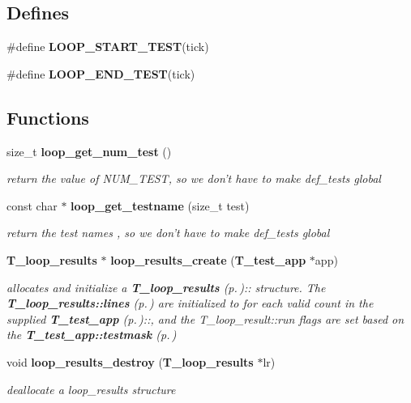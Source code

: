 \subsection*{Defines}
\begin{CompactItemize}
\item 
\#define {\bf LOOP\_\-START\_\-TEST}(tick)
\item 
\#define {\bf LOOP\_\-END\_\-TEST}(tick)
\end{CompactItemize}
\subsection*{Functions}
\begin{CompactItemize}
\item 
size\_\-t {\bf loop\_\-get\_\-num\_\-test} ()
\begin{CompactList}\small\item\em return the value of NUM\_\-TEST, so we don't have to make def\_\-tests global\item\end{CompactList}\item 
const char $\ast$ {\bf loop\_\-get\_\-testname} (size\_\-t test)
\begin{CompactList}\small\item\em return the test names , so we don't have to make def\_\-tests global\item\end{CompactList}\item 
{\bf T\_\-loop\_\-results} $\ast$ {\bf loop\_\-results\_\-create} ({\bf T\_\-test\_\-app} $\ast$app)
\begin{CompactList}\small\item\em allocates and initialize a {\bf T\_\-loop\_\-results} {\rm (p.\,\pageref{structT__loop__results})}:: structure. The {\bf T\_\-loop\_\-results::lines} {\rm (p.\,\pageref{structT__loop__results_m4})} are initialized to for each valid count in the supplied {\bf T\_\-test\_\-app} {\rm (p.\,\pageref{structT__test__app})}::, and the T\_\-loop\_\-result::run flags are set based on the {\bf T\_\-test\_\-app::testmask} {\rm (p.\,\pageref{structT__test__app_m13})}\item\end{CompactList}\item 
void {\bf loop\_\-results\_\-destroy} ({\bf T\_\-loop\_\-results} $\ast$lr)
\begin{CompactList}\small\item\em deallocate a loop\_\-results structure\item\end{CompactList}\item 

\end{CompactItemize}
